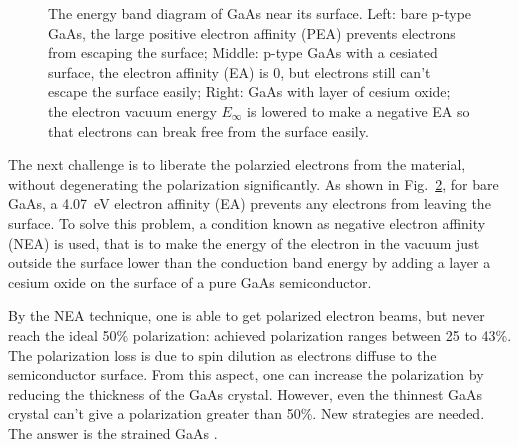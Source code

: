 \begin{figure}[!h]
\begin{subfigure}[b]{0.32\textwidth}
{
	}
	\label{fig:NEA}
    \end{subfigure}
    \caption[Energy band diagram of GaAs]
    {The energy band diagram of GaAs near its surface. 
    Left: bare p-type GaAs, the large positive electron affinity (PEA) 
    prevents electrons from escaping the surface; 
    Middle: p-type GaAs with a cesiated surface, the electron affinity (EA)
    is 0, but electrons still can't escape the surface easily; 
    Right: GaAs with layer of cesium oxide; the electron vacuum energy $E_\infty$ is
    lowered to make a negative EA so that electrons can break free from the surface
    easily. \cite{CARDMAN1992317}}
    \label{fig:electron_affinity}
\end{figure}
The next challenge is to liberate the polarzied electrons from the material, without 
degenerating the polarization significantly. As shown in Fig.~\ref{fig:electron_affinity},
for bare GaAs, a 4.07~eV electron affinity (EA) prevents any electrons from
leaving the surface. To solve this problem, a condition known as negative
electron affinity (NEA) is used, that is to make the energy of the electron in 
the vacuum just outside the surface lower than the conduction band energy by
adding a layer a cesium oxide on the surface of a pure GaAs semiconductor.

By the NEA technique, one is able to get polarized electron beams, but never
reach the ideal 50\% polarization: achieved polarization ranges between 25 to 43\%. 
The polarization loss is due to spin dilution as electrons diffuse to the 
semiconductor surface. From this aspect, one can increase the polarization by 
reducing the thickness of the GaAs crystal. However, even the thinnest
GaAs crystal can't give a polarization greater than 50\%. New strategies 
are needed. The answer is the strained GaAs \cite{CARDMAN1992317}.


